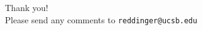 \documentclass[professionalfont,10pt]{beamer}
\begin{document}
\begin{frame}
\vfill
\begin{center}
{\Large Thank you!} \\
\vspace{1\baselineskip}
Please send any comments to \texttt{reddinger@ucsb.edu}
\end{center}
\vfill
\end{frame}
\end{document}

